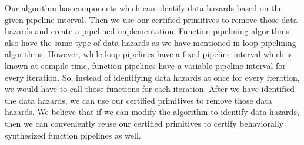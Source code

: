 Our algorithm has components which can identify data hazards based on the given pipeline interval. Then we use our certified primitives to remove those data hazards and create a pipelined implementation. Function pipelining algorithms also have the same type of data hazards as we have mentioned in loop pipelining algorithms. However, while loop pipelines have a fixed pipeline interval which is known at compile time, function pipelines have a variable pipeline interval for every iteration. So, instead of identifying data hazards at once for every iteration, we would have to call those functions for each iteration. After we have identified the data hazards, we can use our certified primitives to remove those data hazards. We believe that if we can modify the algorithm to identify data hazards, then we can conveniently reuse our certified primitives to certify behaviorally synthesized function pipelines as well.     